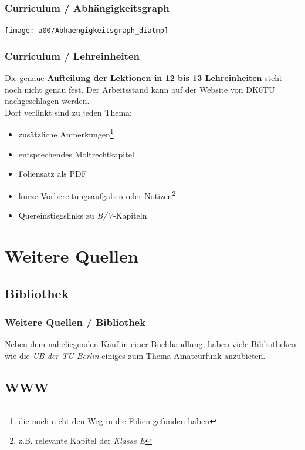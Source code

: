 \begin{frame}
    \frametitle{Curriculum / Abhängigkeitsgraph}

    \texttt{[image: a00/Abhaengigkeitsgraph\_diatmp]}

\end{frame}

\begin{frame}
    \frametitle{Curriculum / Lehreinheiten}

    Die genaue \textbf{Aufteilung der Lektionen in 12 bis 13 Lehreinheiten}
    steht noch nicht genau fest. Der Arbeitsstand kann auf der Website von
    DK0TU\hyperlink{refs}{\cite{curr}} nachgeschlagen werden. \\[2em]

    Dort verlinkt sind zu jeden Thema:

    \begin{itemize}
        \item zusätzliche Anmerkungen\footnote{die noch nicht den Weg in die
              Folien gefunden haben}
        \item entsprechendes Moltrechtkapitel
        \item Foliensatz als PDF
        \item kurze Vorbereitungsaufgaben oder Notizen\footnote{z.B. relevante
              Kapitel der \emph{Klasse E}}
        \item Quereinstiegslinks zu \emph{B/V}-Kapiteln
    \end{itemize}

\end{frame}

\section{Weitere Quellen}

\subsection{Bibliothek}
\begin{frame}
    \frametitle{Weitere Quellen / Bibliothek}

    Neben dem naheliegenden Kauf in einer Buchhandlung, haben viele Bibliotheken
    wie die \emph{UB der TU Berlin}\hyperlink{refs}{\cite{ub}} einiges zum Thema
    Amateurfunk anzubieten.

\end{frame}

\subsection{WWW}

